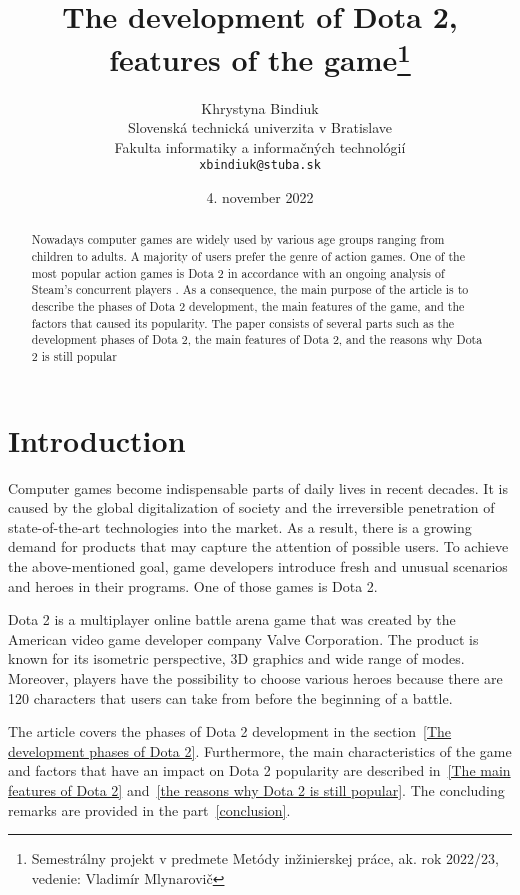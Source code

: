 \documentclass[10pt,twoside,slovak,a4paper]{article}
\title{The development of Dota 2, features of the game\thanks{Semestrálny projekt v predmete Metódy inžinierskej práce, ak. rok 2022/23, vedenie: Vladimír Mlynarovič}} %
\author{Khrystyna Bindiuk\\[2pt]
	{\small Slovenská technická univerzita v Bratislave}\\
	{\small Fakulta informatiky a informačných technológií}\\
	{\small \texttt{xbindiuk@stuba.sk}}
	}
\date{\small 4. november 2022} %
\begin{document}
\maketitle

\begin{abstract}

Nowadays computer games are widely used by various age groups ranging from children to adults. A majority of users prefer the genre of action games\cite{Research:Top}. One of the most popular action games is Dota 2 in accordance with an ongoing analysis of Steam's concurrent players \cite{Steam:Dota}. As a consequence, the main purpose of the article is to describe the phases of Dota 2 development, the main features of the game, and the factors that caused its popularity. The paper consists of several parts such as the development phases of Dota 2, the main features of Dota 2, and the reasons why Dota 2 is still popular
\end{abstract}



\section{Introduction}

Computer games become indispensable parts of daily lives in recent decades. It is caused by the global digitalization of society and the irreversible penetration of state-of-the-art technologies into the market. As a result, there is a growing demand for products that may capture the attention of possible users. To achieve the above-mentioned goal, game developers introduce fresh and unusual scenarios and heroes in their programs. One of those games is Dota 2. 

Dota 2 is a multiplayer online battle arena game that was created by the American video game developer company Valve Corporation. The product is known for its isometric perspective, 3D graphics and wide range of modes. Moreover, players have the possibility to choose various heroes because there are 120 characters that users can take from before the beginning of a battle.

The article covers the phases of Dota 2 development in the section~\ref{The development phases of Dota 2}. Furthermore, the main characteristics of the game and factors that have an impact on Dota 2 popularity are described in~\ref{The main features of Dota 2} and~\ref{the reasons why Dota 2 is still popular}. The concluding remarks are provided in the part~\ref{conclusion}.
\end{document}
